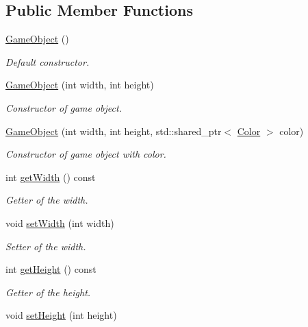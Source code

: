 \subsection*{Public Member Functions}
\begin{DoxyCompactItemize}
\item 
\mbox{\label{classGameObject_a0348e3ee2e83d56eafca7a3547f432c4}} 
\hyperlink{classGameObject_a0348e3ee2e83d56eafca7a3547f432c4}{Game\+Object} ()
\begin{DoxyCompactList}\small\item\em Default constructor. \end{DoxyCompactList}\item 
\hyperlink{classGameObject_af1571c09945131e1d791dfbbe56d69df}{Game\+Object} (int width, int height)
\begin{DoxyCompactList}\small\item\em Constructor of game object. \end{DoxyCompactList}\item 
\hyperlink{classGameObject_ae18349131123d744c2f0e89114272b38}{Game\+Object} (int width, int height, std\+::shared\+\_\+ptr$<$ \hyperlink{structColor}{Color} $>$ color)
\begin{DoxyCompactList}\small\item\em Constructor of game object with color. \end{DoxyCompactList}\item 
int \hyperlink{classGameObject_a912dd50a89fa0ea4bb674ece6fd993a4}{get\+Width} () const
\begin{DoxyCompactList}\small\item\em Getter of the width. \end{DoxyCompactList}\item 
void \hyperlink{classGameObject_aea1d6398e4b66af6987c24e7728463ad}{set\+Width} (int width)
\begin{DoxyCompactList}\small\item\em Setter of the width. \end{DoxyCompactList}\item 
int \hyperlink{classGameObject_a6aac91785cfba6631668db216235c79e}{get\+Height} () const
\begin{DoxyCompactList}\small\item\em Getter of the height. \end{DoxyCompactList}\item 
void \hyperlink{classGameObject_aa08869921287057b06c7f2ae89eef9ab}{set\+Height} (int height)

\end{DoxyCompactItemize}
